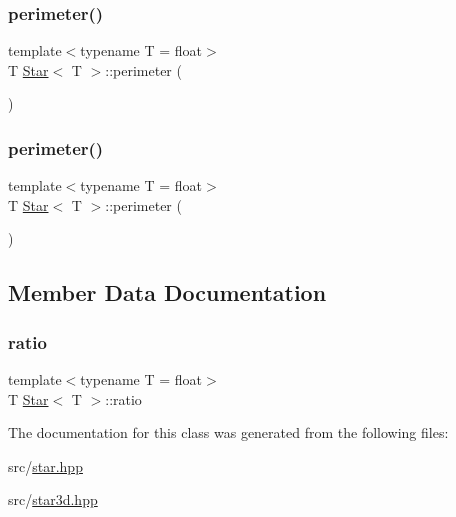 \mbox{\label{classStar_a908253192d0b1fe95aeeaa81322545bf}} 
\subsubsection{\texorpdfstring{perimeter()}{perimeter()}\hspace{0.1cm}{\footnotesize\ttfamily [1/2]}}
{\footnotesize\ttfamily template$<$typename T  = float$>$ \\
T \mbox{\hyperlink{classStar}{Star}}$<$ T $>$\+::perimeter (\begin{DoxyParamCaption}{ }\end{DoxyParamCaption})}

\mbox{\label{classStar_a908253192d0b1fe95aeeaa81322545bf}} 
\subsubsection{\texorpdfstring{perimeter()}{perimeter()}\hspace{0.1cm}{\footnotesize\ttfamily [2/2]}}
{\footnotesize\ttfamily template$<$typename T  = float$>$ \\
T \mbox{\hyperlink{classStar}{Star}}$<$ T $>$\+::perimeter (\begin{DoxyParamCaption}{ }\end{DoxyParamCaption})}



\subsection{Member Data Documentation}
\mbox{\label{classStar_a349e0820769da7e4f76aea0ad6002bf8}} 
\subsubsection{\texorpdfstring{ratio}{ratio}}
{\footnotesize\ttfamily template$<$typename T  = float$>$ \\
T \mbox{\hyperlink{classStar}{Star}}$<$ T $>$\+::ratio}



The documentation for this class was generated from the following files\+:\begin{DoxyCompactItemize}
\item 
src/\mbox{\hyperlink{star_8hpp}{star.\+hpp}}\item 
src/\mbox{\hyperlink{star3d_8hpp}{star3d.\+hpp}}\end{DoxyCompactItemize}
